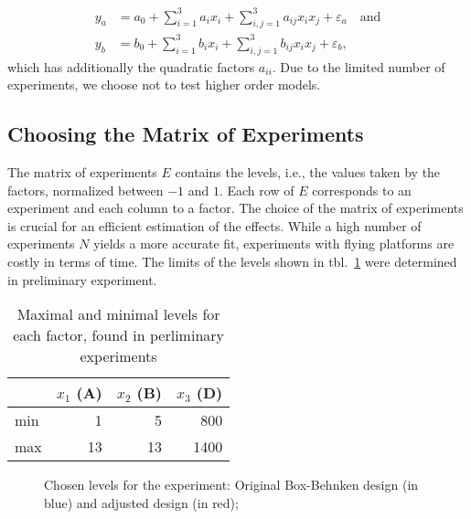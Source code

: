 \begin{subequations}\label{eq:model_quadr}
\begin{align}
	y_a &= a_0 + \displaystyle\sum_{i=1}^{3} a_i x_i + \displaystyle\sum_{i,j=1}^{3} a_{ij} x_i x_j + \varepsilon_a \quad \text{and}\\ 
	y_b &= b_0 + \displaystyle\sum_{i=1}^{3} b_i x_i + \displaystyle\sum_{i,j=1}^{3} b_{ij} x_i x_j + \varepsilon_b,
\end{align}
\end{subequations}
which has additionally the quadratic factors $a_{ii}$.
Due to the limited number of experiments, we choose not to test higher order models.

\subsection{Choosing the Matrix of Experiments}
The matrix of experiments $E$ contains the levels, i.e., the values taken by the factors, normalized between $-1$ and $1$. Each row of $E$ corresponds to an experiment and each column to a factor. The choice of the matrix of experiments is crucial for an efficient estimation of the effects. While a high number of experiments $N$ yields a more accurate fit, experiments with flying platforms are costly in terms of time. The limits of the levels shown in tbl.~\ref{tbl:levels} were determined in preliminary experiment.
\begin{table}[h!]
	\centering
	\begin{tabular}{l r r r}
	 & $x_1$ (A) & $x_2$ (B) & $x_3$ (D) \\\hline
	min & 1 & 5 & 800\\
	max & 13 & 13 & 1400 \\
	\end{tabular}
	\caption{Maximal and minimal levels for each factor, found in perliminary experiments}\label{tbl:levels}
\end{table}
\begin{figure}[h]
    \centering
	\setlength{\abovecaptionskip}{1pt plus 3pt minus 0pt}
	\setlength{\figH}{0.25\textwidth}
	
    \caption{Chosen levels for the experiment: Original Box-Behnken design (in blue) and adjusted design (in red);}\label{fig:design}
\end{figure} 

